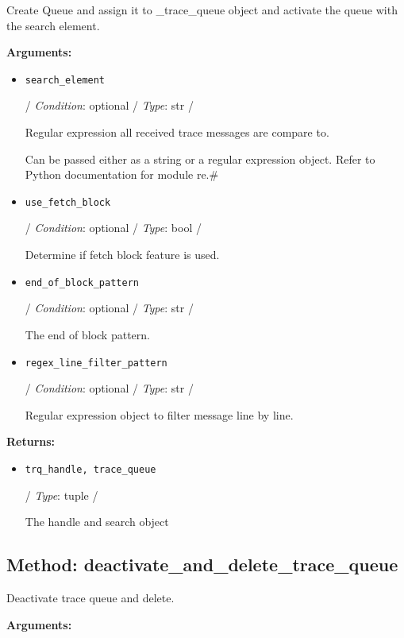 Create Queue and assign it to \_trace\_queue object and activate the
queue with the search element.

\textbf{Arguments:}

\begin{itemize}
\item
  \texttt{search\_element}

  / \emph{Condition}: optional / \emph{Type}: str /

  Regular expression all received trace messages are compare to.

  Can be passed either as a string or a regular expression object. Refer
  to Python documentation for module
  \textquotesingle re\textquotesingle.\#
\item
  \texttt{use\_fetch\_block}

  / \emph{Condition}: optional / \emph{Type}: bool /

  Determine if \textquotesingle fetch block\textquotesingle{} feature is
  used.
\item
  \texttt{end\_of\_block\_pattern}

  / \emph{Condition}: optional / \emph{Type}: str /

  The end of block pattern.
\item
  \texttt{regex\_line\_filter\_pattern}

  / \emph{Condition}: optional / \emph{Type}: str /

  Regular expression object to filter message line by line.
\end{itemize}

\textbf{Returns:}

\begin{itemize}
\item
  \texttt{trq\_handle,\ trace\_queue}

  / \emph{Type}: tuple /

  The handle and search object
\end{itemize}

\hypertarget{qconnectbase-connection-base-method-deactivate_and_delete_trace_queue-15}{%
\subsection{Method:
deactivate\_and\_delete\_trace\_queue}\label{qconnectbase-connection-base-method-deactivate_and_delete_trace_queue-15}}

Deactivate trace queue and delete.

\textbf{Arguments:}

